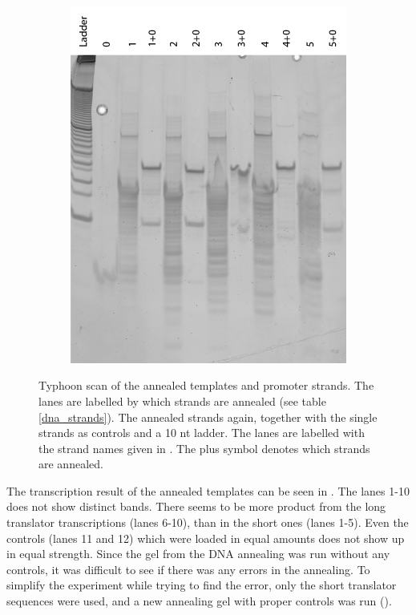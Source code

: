 \begin{figure}[h]
\begin{subfigure}[t]{0.46\textwidth}
  \includegraphics[width=\textwidth]{images/translator_annealing_2.png}
  \caption{}
  \label{translator_annealing_2}
\end{subfigure}
\caption{ Typhoon scan of the annealed templates and promoter strands. The lanes are labelled by which strands are annealed (see table \ref{dna_strands}).  The annealed strands again, together with the single strands as controls and a 10 nt ladder. The lanes are labelled with the strand names given in . The plus symbol denotes which strands are annealed.}
\end{figure}

The transcription result of the annealed templates can be seen in . The lanes 1-10 does not show distinct bands. There seems to be more product from the long translator transcriptions (lanes 6-10), than in the short ones (lanes 1-5). Even the controls (lanes 11 and 12) which were loaded in equal amounts does not show up in equal strength. Since the gel from the DNA annealing was run without any controls, it was difficult to see if there was any errors in the annealing. To simplify the experiment while trying to find the error, only the short translator sequences were used, and a new annealing gel with proper controls was run ().

